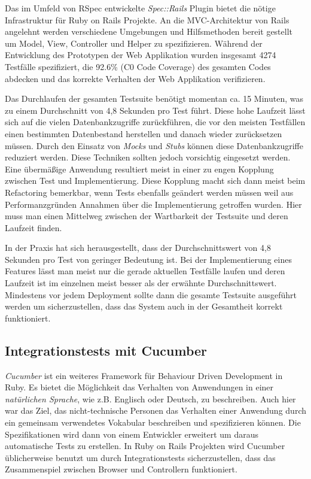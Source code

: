 Das im Umfeld von RSpec entwickelte \textit{Spec::Rails} Plugin bietet
die nötige Infrastruktur für Ruby on Rails Projekte. An die
MVC-Architektur von Rails angelehnt werden verschiedene Umgebungen und
Hilfsmethoden bereit gestellt um Model, View, Controller und Helper zu
spezifizieren. Während der Entwicklung des Prototypen der Web
Applikation wurden insgesamt 4274 Testfälle spezifiziert, die 92.6\%
(C0 Code Coverage) des gesamten Codes abdecken und das korrekte
Verhalten der Web Applikation verifizieren.

Das Durchlaufen der gesamten Testsuite benötigt momentan ca. 15
Minuten, was zu einem Durchschnitt von 4,8 Sekunden pro Test
führt. Diese hohe Laufzeit lässt sich auf die vielen Datenbankzugriffe
zurückführen, die vor den meisten Testfällen einen bestimmten
Datenbestand herstellen und danach wieder zurücksetzen müssen. Durch
den Einsatz von \textit{Mocks} und \textit{Stubs} können diese
Datenbankzugriffe reduziert werden. Diese Techniken sollten jedoch
vorsichtig eingesetzt werden. Eine übermäßige Anwendung resultiert
meist in einer zu engen Kopplung zwischen Test und
Implementierung. Diese Kopplung macht sich dann meist beim Refactoring
bemerkbar, wenn Tests ebenfalls geändert werden müssen weil aus
Performanzgründen Annahmen über die Implementierung getroffen
wurden. Hier muss man einen Mittelweg zwischen der Wartbarkeit der
Testsuite und deren Laufzeit finden.

In der Praxis hat sich herausgestellt, dass der Durchschnittswert von
4,8 Sekunden pro Test von geringer Bedeutung ist. Bei der
Implementierung eines Features lässt man meist nur die gerade
aktuellen Testfälle laufen und deren Laufzeit ist im einzelnen meist
besser als der erwähnte Durchschnittswert. Mindestens vor jedem
Deployment sollte dann die gesamte Testsuite ausgeführt werden um
sicherzustellen, dass das System auch in der Gesamtheit korrekt
funktioniert.

\subsection{Integrationstests mit Cucumber}

\textit{Cucumber} \cite{cucumber} ist ein weiteres Framework für
Behaviour Driven Development in Ruby. Es bietet die Möglichkeit das
Verhalten von Anwendungen in einer \textit{natürlichen Sprache}, wie
z.B. Englisch oder Deutsch, zu beschreiben. Auch hier war das Ziel,
das nicht-technische Personen das Verhalten einer Anwendung durch ein
gemeinsam verwendetes Vokabular beschreiben und spezifizieren können.
Die Spezifikationen wird dann von einem Entwickler erweitert um daraus
automatische Tests zu erstellen. In Ruby on Rails Projekten wird
Cucumber üblicherweise benutzt um durch Integrationstests
sicherzustellen, dass das Zusammenspiel zwischen Browser und
Controllern funktioniert.

